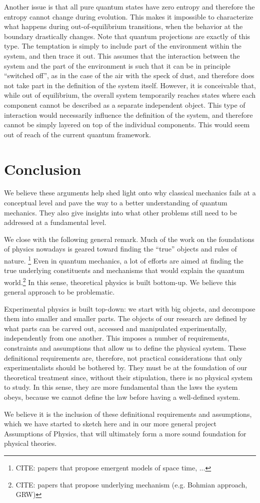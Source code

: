 \documentclass[10pt,twocolumn, nofootinbib]{revtex4-2}
\begin{document}
Another issue is that all pure quantum states have zero entropy and therefore the entropy cannot change during evolution. This makes it impossible to characterize what happens during out-of-equilibrium transitions, when the behavior at the boundary drastically changes. Note that quantum projections are exactly of this type. The temptation is simply to include part of the environment within the system, and then trace it out. This assumes that the interaction between the system and the part of the environment is such that it can be in principle ``switched off'', as in the case of the air with the speck of dust, and therefore does not take part in the definition of the system itself. However, it is conceivable that, while out of equilibrium, the overall system temporarily reaches states where each component cannot be described as a separate independent object. This type of interaction would necessarily influence the definition of the system, and therefore cannot be simply layered on top of the individual components. This would seem out of reach of the current quantum framework.

\section{Conclusion}

We believe these arguments help shed light onto why classical mechanics fails at a conceptual level and pave the way to a better understanding of quantum mechanics. They also give insights into what other problems still need to be addressed at a fundamental level.

We close with the following general remark. Much of the work on the foundations of physics nowadays is geared toward finding the ``true'' objects and rules of nature. \footnote{CITE: papers that propose emergent models of space time, ...} Even in quantum mechanics, a lot of efforts are aimed at finding the true underlying constituents and mechanisms that would explain the quantum world.\footnote{CITE: papers that propose underlying mechanism (e.g. Bohmian approach, GRW)} In this sense, theoretical physics is built bottom-up. We believe this general approach to be problematic.

Experimental physics is built top-down: we start with big objects, and decompose them into smaller and smaller parts. The objects of our research are defined by what parts can be carved out, accessed and manipulated experimentally, independently from one another. This imposes a number of requirements, constraints and assumptions that allow us to define the physical system. These definitional requirements are, therefore, not practical considerations that only experimentalists should be bothered by. They must be at the foundation of our theoretical treatment since, without their stipulation, there is no physical system to study. In this sense, they are more fundamental than the laws the system obeys, because we cannot define the law before having a well-defined system.

We believe it is the inclusion of these definitional requirements and assumptions, which we have started to sketch here and in our more general project Assumptions of Physics, that will ultimately form a more sound foundation for physical theories.




\end{document}
